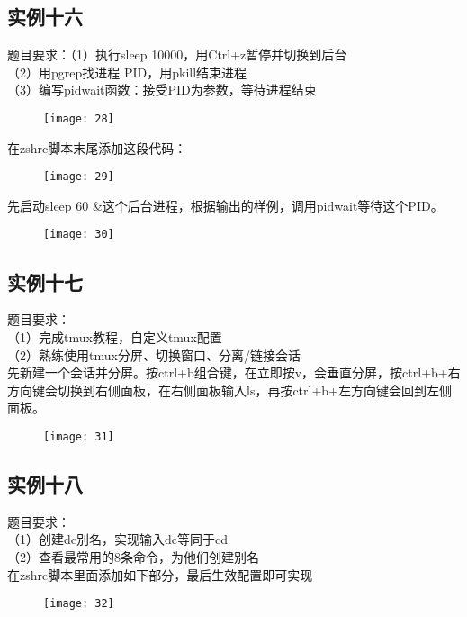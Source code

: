 \documentclass[12pt,letterpaper]{article}
\begin{document}
\subsection{实例十六}
题目要求：（1）执行sleep 10000，用Ctrl+z暂停并切换到后台\\
（2）用pgrep找进程 PID，用pkill结束进程\\
（3）编写pidwait函数：接受PID为参数，等待进程结束
\begin{figure}[H]
\centering
\texttt{[image: 28]}
\end{figure}
在zshrc脚本末尾添加这段代码：
\begin{figure}[H]
\centering
\texttt{[image: 29]}
\end{figure}
先启动sleep 60 \&这个后台进程，根据输出的样例，调用pidwait等待这个PID。
\begin{figure}[H]
\centering
\texttt{[image: 30]}
\end{figure}

\subsection{实例十七}
题目要求：\\
（1）完成tmux教程，自定义tmux配置\\
（2）熟练使用tmux分屏、切换窗口、分离/链接会话\\
先新建一个会话并分屏。按ctrl+b组合键，在立即按v，会垂直分屏，按ctrl+b+右方向键会切换到右侧面板，在右侧面板输入ls，再按ctrl+b+左方向键会回到左侧面板。
\begin{figure}[H]
\centering
\texttt{[image: 31]}
\end{figure}

\subsection{实例十八}
题目要求：\\
（1）创建dc别名，实现输入dc等同于cd\\
（2）查看最常用的8条命令，为他们创建别名\\
在zshrc脚本里面添加如下部分，最后生效配置即可实现
\begin{figure}[H]
\centering
\texttt{[image: 32]}
\end{figure}
\end{document}
